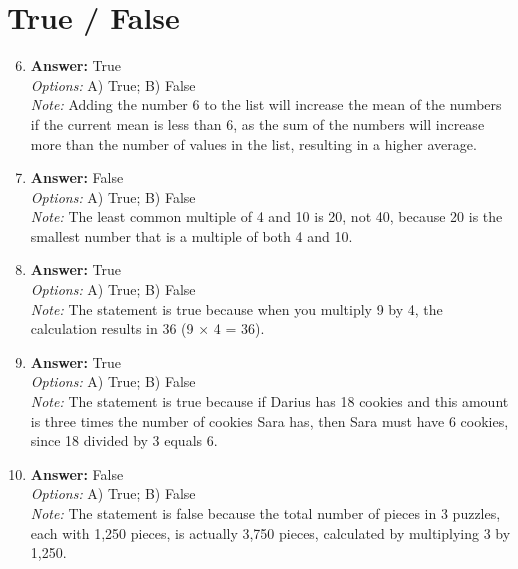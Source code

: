 \documentclass[12pt]{article}
\begin{document}
\section*{True / False}
\begin{enumerate}[label=\arabic*.]
\setcounter{enumi}{5}
\item \textbf{Answer:} True
\\ \textit{Options:} A) True; B) False
\\ \textit{Note:} Adding the number 6 to the list will increase the mean of the numbers if the current mean is less than 6, as the sum of the numbers will increase more than the number of values in the list, resulting in a higher average.
\item \textbf{Answer:} False
\\ \textit{Options:} A) True; B) False
\\ \textit{Note:} The least common multiple of 4 and 10 is 20, not 40, because 20 is the smallest number that is a multiple of both 4 and 10.
\item \textbf{Answer:} True
\\ \textit{Options:} A) True; B) False
\\ \textit{Note:} The statement is true because when you multiply 9 by 4, the calculation results in 36 (9 × 4 = 36).
\item \textbf{Answer:} True
\\ \textit{Options:} A) True; B) False
\\ \textit{Note:} The statement is true because if Darius has 18 cookies and this amount is three times the number of cookies Sara has, then Sara must have 6 cookies, since 18 divided by 3 equals 6.
\item \textbf{Answer:} False
\\ \textit{Options:} A) True; B) False
\\ \textit{Note:} The statement is false because the total number of pieces in 3 puzzles, each with 1,250 pieces, is actually 3,750 pieces, calculated by multiplying 3 by 1,250.
\end{enumerate}
\end{document}

